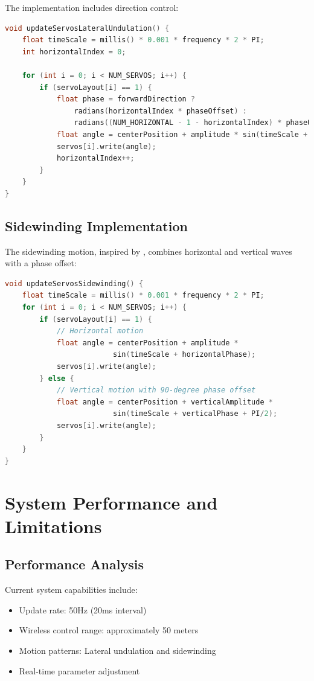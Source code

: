 \documentclass[12pt,a4paper]{report}
\begin{document}
The implementation includes direction control:

\begin{lstlisting}[language=C++]
void updateServosLateralUndulation() {
    float timeScale = millis() * 0.001 * frequency * 2 * PI;
    int horizontalIndex = 0;
    
    for (int i = 0; i < NUM_SERVOS; i++) {
        if (servoLayout[i] == 1) {
            float phase = forwardDirection ? 
                radians(horizontalIndex * phaseOffset) : 
                radians((NUM_HORIZONTAL - 1 - horizontalIndex) * phaseOffset);
            float angle = centerPosition + amplitude * sin(timeScale + phase);
            servos[i].write(angle);
            horizontalIndex++;
        }
    }
}
\end{lstlisting}

\subsection{Sidewinding Implementation}
The sidewinding motion, inspired by \cite{yamano-2023}, combines horizontal and vertical waves with a phase offset:

\begin{lstlisting}[language=C++]
void updateServosSidewinding() {
    float timeScale = millis() * 0.001 * frequency * 2 * PI;
    for (int i = 0; i < NUM_SERVOS; i++) {
        if (servoLayout[i] == 1) {
            // Horizontal motion
            float angle = centerPosition + amplitude * 
                         sin(timeScale + horizontalPhase);
            servos[i].write(angle);
        } else {
            // Vertical motion with 90-degree phase offset
            float angle = centerPosition + verticalAmplitude * 
                         sin(timeScale + verticalPhase + PI/2);
            servos[i].write(angle);
        }
    }
}
\end{lstlisting}

\section{System Performance and Limitations}
\subsection{Performance Analysis}
Current system capabilities include:
\begin{itemize}
    \item Update rate: 50Hz (20ms interval)
    \item Wireless control range: approximately 50 meters
    \item Motion patterns: Lateral undulation and sidewinding
    \item Real-time parameter adjustment
\end{itemize}
\end{document}
